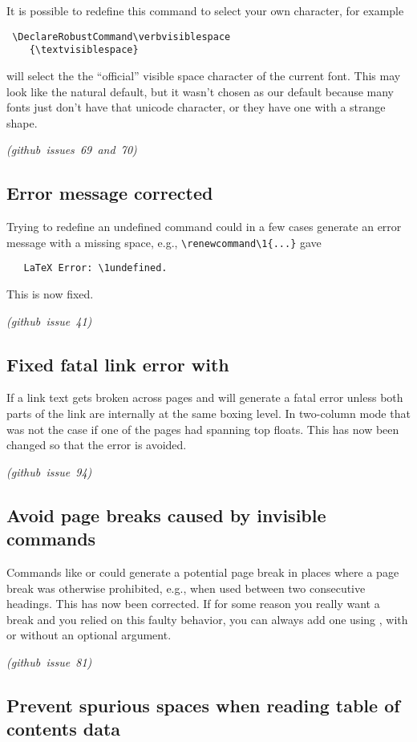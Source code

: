 \documentclass{ltnews}
\providecommand\LuaTeX{\hologo{LuaTeX}}
\providecommand\pdfTeX{\hologo{pdfTeX}}
\newcommand\githubissue[2][]{\ifhmode\unskip\fi
     \quad\penalty500\strut\nobreak\hfill
     \mbox{\small\itshape(github issue#1 #2)}\par}
\begin{document}
It is possible to redefine this command to select your own character,
for example
\begin{verbatim}
 \DeclareRobustCommand\verbvisiblespace
    {\textvisiblespace}
\end{verbatim}
will select the the ``official'' visible space character of the
current font. This may look like the natural default, but it wasn't
chosen as our default because many fonts just don't have that unicode
character, or they have one with a strange shape.
%
\githubissue[s]{69 and 70}

        
\subsection{Error message corrected}
Trying to redefine an undefined command could in a few cases generate
an error message with a missing space, e.g.,
\verb=\renewcommand\1{...}= gave
\begin{verbatim}
   LaTeX Error: \1undefined.
\end{verbatim}
This is now fixed.
%
\githubissue{41}

        
\subsection{Fixed fatal link error with }

If a  link text gets broken across pages \pdfTeX{} and
\LuaTeX{} will generate a fatal error unless both parts of the link
are internally at the same boxing level. In two-column mode that was
not the case if one of the pages had spanning top floats. This has now
been changed so that the error is avoided.
%
\githubissue{94}


\subsection{Avoid page breaks caused by invisible commands}

Commands like  or  could generate a potential page
break in places where a page break was otherwise prohibited, e.g.,
when used between two consecutive headings. This has now been
corrected. If for some reason you really want a break and you relied
on this faulty behavior, you can always add one using ,
with or without an optional argument.
%
\githubissue{81}



\subsection{Prevent spurious spaces when reading table of contents data}
\end{document}
